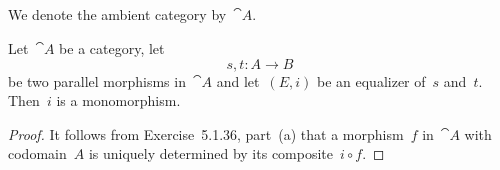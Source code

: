 \subsection{}

We denote the ambient category by~$\cat{A}$.

\begin{proposition}
	Let~$\cat{A}$ be a category, let
	\[
		s, t \colon A \to B
	\]
	be two parallel morphisms in~$\cat{A}$ and let~$(E, i)$ be an equalizer of~$s$ and~$t$.
	Then~$i$ is a monomorphism.
\end{proposition}

\begin{proof}
	It follows from Exercise~5.1.36, part~(a) that a morphism~$f$ in~$\cat{A}$ with codomain~$A$ is uniquely determined by its composite~$i ∘ f$.
\end{proof}

